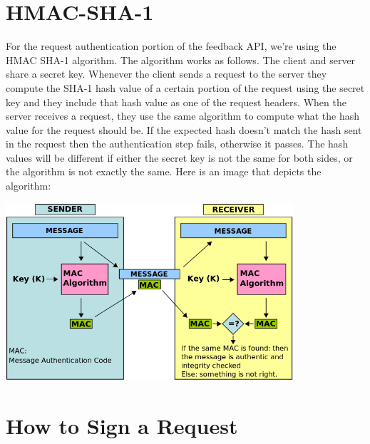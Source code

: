 
\section{HMAC-SHA-1}

For the request authentication portion of the feedback API, we're using the HMAC SHA-1
algorithm. The algorithm works as follows. The client and server share a secret key.
Whenever the client sends a request to the server they compute the SHA-1 hash value of
a certain portion of the request using the secret key and they include that hash value
as one of the request headers. When the server receives a request, they use the same
algorithm to compute what the hash value for the request should be. If the expected hash
doesn't match the hash sent in the request then the authentication step fails, otherwise
it passes. The hash values will be different if either the secret key is not the same
for both sides, or the algorithm is not exactly the same. Here is an image that depicts
the algorithm:

\vspace{1cm}

\begin{center}
\includegraphics[width=0.8\textwidth]{HMAC_Explanation.png}
\end{center}



\section{How to Sign a Request}

